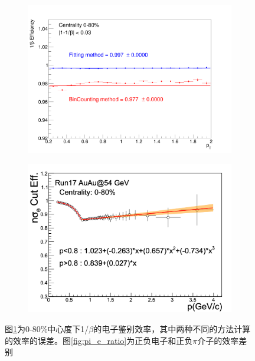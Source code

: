 \begin{figure}[htb]
    \centering
    \begin{subfigure}[b]{0.47\textwidth}
        \centering
        \includegraphics[width=\textwidth,clip]{figures/Chapter4/beta_cut_eff_080.png}
        \caption{}
        \label{fig:beta_cut_eff_080}
    \end{subfigure}
    \hfill
    \begin{subfigure}[b]{0.47\textwidth}
        \centering
        \includegraphics[width=\textwidth,clip]{figures/Chapter4/nSigmaE_cut_eff.png}
        \caption{}
        \label{fig:nSigmaE_cut_eff}
    \end{subfigure}
       \caption[电子鉴别效率示意图]{图\ref{fig:beta_cut_eff_080}为0-80\%中心度下1/$\beta$的电子鉴别效率，其中两种不同的方法计算的效率的误差。图\ref{fig:pi_e_ratio}为正负电子和正负$\pi$介子的效率差别}
       \label{fig:TOFEff}
\end{figure}

